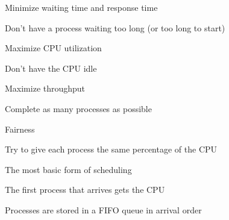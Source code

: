   \begin{slide}


    Minimize waiting time and response time

    \leftspace{}Don't have a process waiting too long (or too long to start)
    \medskip

    Maximize CPU utilization

    \leftspace{}Don't have the CPU idle
    \medskip

    Maximize throughput

    \leftspace{}Complete as many processes as possible
    \medskip

    Fairness

    \leftspace{}Try to give each process the same percentage of the CPU

  \end{slide}

  \begin{slide}


    The most basic form of scheduling
    \medskip

    The first process that arrives gets the CPU
    \medskip

    Processes are stored in a FIFO queue in arrival order

  \end{slide}
  
